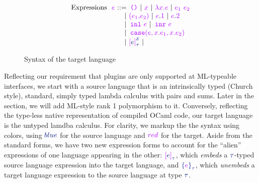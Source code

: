 \begin{figure}[h]
  \centering
\[\begin{array}{@{}l@{~~}l@{~}r@{}l@{}}
\mbox{Expressions} & \texp & \bnfdef & \tunit \bnfalt \tvar{x} \bnfalt \tabs{\tvar{x}}{\texp} \bnfalt \tapp{\texp_{\target{1}}}{\texp_{\target{2}}} \\
& & \bnfalt & \tpair{\texp_{\target{1}}}{\texp_{\target{2}}} \bnfalt \tfst{\texp} \bnfalt \tsnd{\texp} \\
& & \bnfalt & \tinl{\texp} \bnfalt \tinr{\texp} \\
& & \bnfalt & \tcasex{\texp}{\texp_{\target{1}}}{\texp_{\target{2}}} \\
& & \bnfalt & \talien{\sexp}{\stau}{\sdelta} \bnfalt

\end{array}\]
  \caption{Syntax of the target language}
  \label{fig:syntax-target}
\end{figure}
\fi

Reflecting our requirement that plugins are only supported at
ML-typeable interfaces, we start with a
source language that is an intrinsically typed (Church
style), standard, simply typed lambda calculus with pairs and
sums. Later in the section, we
will add ML-style rank 1 polymorphism to it.
%
Conversely, reflecting
the type-less native representation of compiled OCaml code, our target
language is the untyped lamdba calculus.
For clarity, we markup the the syntax using colors, using
$\source{blue}$ for the source language and $\target{red}$ for the target.
Aside from the standard forms, we
have two new expression forms to account for the ``alien''
expressions of one language appearing in the other:
$\talien{\sexp}{\stau}{}$, which \emph{embeds} a
$\stau$-typed source language expression into the target language, and 
$\salien{\texp}{\stau}{}$,
which \emph{unembeds} a target language expression to the source language at
type $\stau$.



